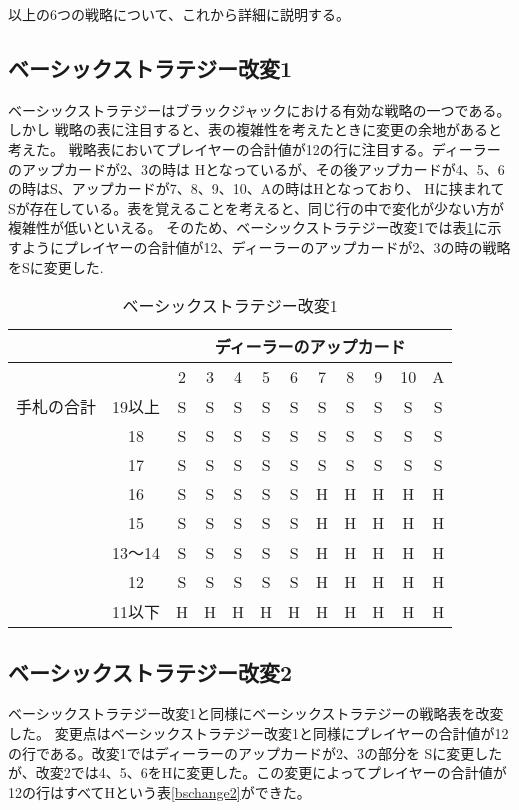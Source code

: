 以上の6つの戦略について、これから詳細に説明する。

\subsection{ベーシックストラテジー改変1}
ベーシックストラテジーはブラックジャックにおける有効な戦略の一つである。しかし
戦略の表に注目すると、表の複雑性を考えたときに変更の余地があると考えた。
戦略表においてプレイヤーの合計値が12の行に注目する。ディーラーのアップカードが2、3の時は
Hとなっているが、その後アップカードが4、5、6の時はS、アップカードが7、8、9、10、Aの時はHとなっており、
Hに挟まれてSが存在している。表を覚えることを考えると、同じ行の中で変化が少ない方が複雑性が低いといえる。
そのため、ベーシックストラテジー改変1では表\ref{bschange1}に示すようにプレイヤーの合計値が12、ディーラーのアップカードが2、3の時の戦略をSに変更した.

\begin{table}[htbp]
  \centering
  \caption{ベーシックストラテジー改変1\label{bschange1}}
  \begin{tabular}{|c|c|c|c|c|c|c|c|c|c|c|c|}
    \hline
    \multicolumn{2}{|c|}{} & \multicolumn{10}{|c|}{ディーラーのアップカード} \\ \hline
    \multicolumn{2}{|c|}{} & 2 & 3 & 4 & 5 & 6 & 7 & 8 & 9 & 10 & A \\ \hline
    手札の合計 & 19以上 & S & S & S & S & S & S & S & S & S & S \\ \cline{3-12}
              & 18 & S & S & S & S & S & S & S & S & S & S \\ \cline{3-12}
              & 17 & S & S & S & S & S & S & S & S & S & S \\ \cline{3-12}
              & 16 & S & S & S & S & S & H & H & H & H & H \\ \cline{3-12}
              & 15 & S & S & S & S & S & H & H & H & H & H \\ \cline{3-12}
              & 13～14 & S & S & S & S & S & H & H & H & H & H \\ \cline{3-12}
              & 12 & S & S & S & S & S & H & H & H & H & H \\ \cline{3-12}
              & 11以下 & H & H & H & H & H & H & H & H & H & H \\ \hline
  \end{tabular}
\end{table}

\subsection{ベーシックストラテジー改変2}
ベーシックストラテジー改変1と同様にベーシックストラテジーの戦略表を改変した。
変更点はベーシックストラテジー改変1と同様にプレイヤーの合計値が12の行である。改変1ではディーラーのアップカードが2、3の部分を
Sに変更したが、改変2では4、5、6をHに変更した。この変更によってプレイヤーの合計値が12の行はすべてHという表\ref{bschange2}ができた。

